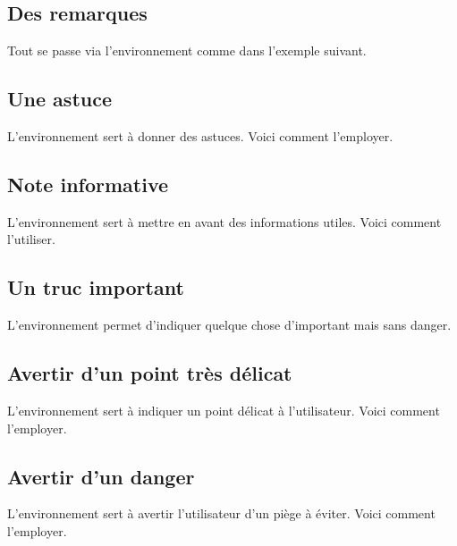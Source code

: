 \subsection{Des remarques}

Tout se passe via l'environnement  comme dans l'exemple suivant.



\subsection{Une astuce}

L'environnement  sert à donner des astuces. Voici comment l'employer.



\subsection{Note informative}

L'environnement  sert à mettre en avant des informations utiles. Voici comment l'utiliser.



\subsection{Un truc important}

L'environnement  permet d'indiquer quelque chose d'important mais sans danger.



\subsection{Avertir d'un point très délicat}

L'environnement  sert à indiquer un point délicat à  l'utilisateur. Voici comment l'employer.



\subsection{Avertir d'un danger}

L'environnement  sert à avertir l'utilisateur d'un piège à éviter. Voici comment l'employer.

